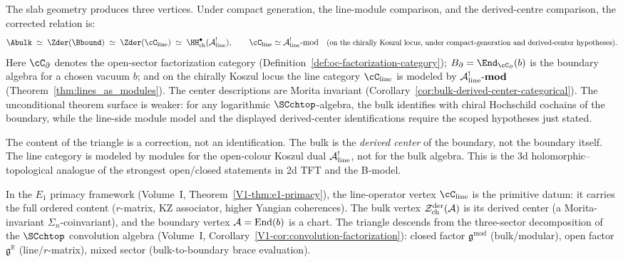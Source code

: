 The slab geometry produces three vertices. Under compact generation,
the line-module comparison, and the derived-centre comparison, the
corrected relation is:
\begin{equation}\label{eq:global-corrected-triangle}
\Abulk
\;\simeq\;
\Zder(\Bbound)
\;\simeq\;
\Zder(\cC_{\mathrm{line}})
\;\simeq\;
\HH^\bullet_{\mathrm{ch}}(\cA^!_{\mathrm{line}}),
\qquad
\cC_{\mathrm{line}}\simeq \cA^!_{\mathrm{line}}\text{-mod}
\quad
\text{\small(on the chirally Koszul locus, under compact-generation
and derived-center hypotheses)}.
\end{equation}
Here $\cC_\partial$ denotes the open-sector factorization category
(Definition~\ref{def:oc-factorization-category}); $B_\partial =
\End_{\cC_\partial}(b)$ is the boundary algebra for a chosen vacuum
$b$; and on the chirally Koszul locus
the line category $\cC_{\mathrm{line}}$ is modeled by
$\mathcal{A}^!_{\mathrm{line}}\text{-}\mathbf{mod}$
(Theorem~\ref{thm:lines_as_modules}). The center descriptions are
Morita invariant
(Corollary~\ref{cor:bulk-derived-center-categorical}). The
unconditional theorem surface is weaker: for any logarithmic
$\SCchtop$-algebra, the bulk identifies with chiral Hochschild
cochains of the boundary, while the line-side module model and the
displayed derived-center identifications require the scoped
hypotheses just stated.

The content of the triangle is a correction, not an identification.
The bulk is the \emph{derived center} of the boundary, not the
boundary itself. The line category is modeled by modules for the
open-colour Koszul dual $\mathcal{A}^!_{\mathrm{line}}$, not for the bulk algebra.
This is the 3d holomorphic--topological analogue of the strongest
open/closed statements in 2d TFT and the B-model.

In the $E_1$ primacy framework
(Volume~I, Theorem~\ref*{V1-thm:e1-primacy}), the line-operator
vertex $\cC_{\mathrm{line}}$ is the primitive datum: it carries the
full ordered content ($r$-matrix, KZ associator, higher Yangian
coherences). The bulk vertex
$\mathcal{Z}^{\mathrm{der}}_{\mathrm{ch}}(\mathcal{A})$ is its derived center (a
Morita-invariant $\Sigma_n$-coinvariant), and the boundary vertex
$\mathcal{A} = \mathrm{End}(b)$ is a chart. The triangle descends from the
three-sector decomposition of the $\SCchtop$ convolution algebra
(Volume~I, Corollary~\ref*{V1-cor:convolution-factorization}):
closed factor $\mathfrak{g}^{\mathrm{mod}}$ (bulk/modular), open
factor $\mathfrak{g}^{\mathbb{R}}$ (line/$r$-matrix), mixed sector
(bulk-to-boundary brace evaluation).

